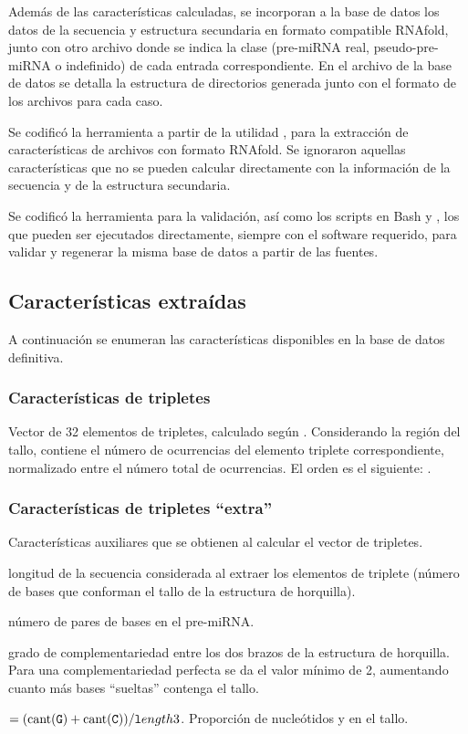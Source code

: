 \documentclass[12pt,bibliography=oldstyle,DIV=12,parskip=half-]{scrreprt}
\begin{document}
Además de las características calculadas, se incorporan a la base de
datos los datos de la secuencia y estructura secundaria en formato
compatible RNAfold, junto con otro archivo donde se indica la clase
(pre-miRNA real, pseudo-pre-miRNA o indefinido) de cada entrada
correspondiente.  En el archivo  de la base de datos
se detalla la estructura de directorios generada junto con el formato
de los archivos para cada caso.

Se codificó la herramienta  a partir de la utilidad
, para la extracción de características de archivos
con formato RNAfold. Se ignoraron aquellas características que no se
pueden calcular directamente con la información de la secuencia y de
la estructura secundaria.

Se codificó la herramienta  para la validación, así
como los scripts en Bash  y ,
los que pueden ser ejecutados directamente, siempre con el software
requerido, para validar y regenerar la misma base de datos a partir de
las fuentes.
%
\subsection{Características extraídas}
%
A continuación se enumeran las características disponibles en la base
de datos definitiva.
%
\subsubsection{Características de tripletes}
Vector de 32 elementos de tripletes, calculado según \cite{xue}.
Considerando la región del tallo, contiene el número de ocurrencias
del elemento triplete correspondiente, normalizado entre el número
total de ocurrencias.  El orden es el siguiente: .
%
\subsubsection{Características de tripletes ``extra''}
Características auxiliares que se obtienen
al calcular el vector de tripletes.
\begin{description}[style=sameline,leftmargin=5cm]
\item[length3] longitud de la secuencia considerada al
  extraer los elementos de triplete (número de bases que
  conforman el tallo de la estructura de horquilla).
\item[basepairs] número de pares de bases en
  el pre-miRNA.
\item[{length3/basepairs}] grado de complementariedad
  entre los dos brazos de la estructura de horquilla. Para una
  complementariedad perfecta se da el valor mínimo de 2, aumentando cuanto más
  bases ``sueltas'' contenga el tallo.
\item[gc\_content] $=(\textrm{cant({\texttt G})}+\textrm{cant({\texttt C})})/{\texttt length3}$. Proporción de nucleótidos  y
   en el tallo.
\end{description}
%
\end{document}
